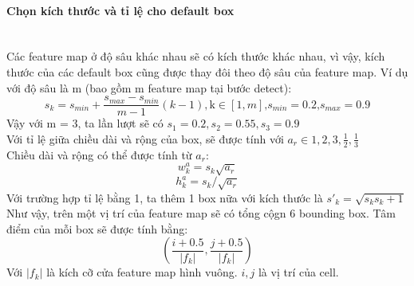   \paragraph{Chọn kích thước và tỉ lệ cho default box}
  \mbox{}\\Các feature map ở độ sâu khác nhau sẽ có kích thước khác nhau, vì vậy, kích thước của các default box cũng được thay đôi theo độ sâu của feature map. Ví dụ với độ sâu là m (bao gồm m feature map tại bước detect):\[s_k = s_{min} + \frac{s_{max} - s_{min}}{m - 1} \left( k - 1 \right), \text{k} \in \left[1,m \right] \text{,} s_{min}=0.2 \text{,} s_{max}=0.9\]
  Vậy với m = 3, ta lần lượt sẽ có \(s_1 = 0.2, s_2 = 0.55, s_3 = 0.9\)
  \\Với tỉ lệ giữa chiều dài và rộng của box, sẽ được tính với \(a_r \in { 1, 2, 3, \frac{1}{2}, \frac{1}{3}}\)
  \\Chiều dài và rộng có thể được tính từ \(a_r\):
  \[w_k^a = s_k \sqrt{a_r}\]
  \[h_k^a = s_k / \sqrt{a_r}\]
  Với trường hợp tỉ lệ bằng 1, ta thêm 1 box nữa với kích thước là \({s\prime}_k = \sqrt{s_ks_k+1}\) Như vậy, trên một vị trí của feature map sẽ có tổng cộgn 6 bounding box. Tâm điểm của mỗi box sẽ được tính bằng:
  \[\left( \frac{i+0.5}{\vert f_k \vert}, \frac{j+0.5}{\vert f_k \vert} \right)\]
  Với \(\vert f_k \vert\) là kích cỡ cửa feature map hình vuông. \(i , j\) là vị trí của cell.

\newpage